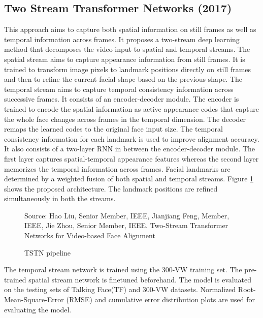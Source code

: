 \documentclass{llncs}
\begin{document}
\subsection{Two Stream Transformer Networks (2017) \textcolor{green}{\cite{tstn}}}

This approach aims to capture both spatial information on still frames as well as temporal information across frames. It proposes a two-stream deep learning method that decomposes the video input to spatial and temporal streams. The spatial stream aims to capture appearance information from still frames. It is trained to transform image pixels to landmark positions directly on still frames and then to refine the current facial shape based on the previous shape. The temporal stream aims to capture temporal consistency information across successive frames. It consists of an encoder-decoder module. The encoder is trained to encode the spatial information as active appearance codes that capture the whole face changes across frames in the temporal dimension. The decoder remaps the learned codes to the original face input size. The temporal consistency information for each landmark is used to improve alignment accuracy. It also consists of a two-layer RNN in between the encoder-decoder module. The first layer captures spatial-temporal appearance features whereas the second layer memorizes the temporal information across frames. Facial landmarks are determined by a weighted fusion of both spatial and temporal streams. Figure \textcolor{red}{\ref{TSTN}} shows the proposed architecture. The landmark positions are refined simultaneously in both the streams.

\begin{figure}
%
{Source: Hao Liu, Senior Member, IEEE, Jianjiang Feng, Member, IEEE, Jie Zhou, Senior Member, IEEE. Two-Stream Transformer Networks for Video-based Face Alignment}
\caption{TSTN pipeline}
\label{TSTN}
\end{figure}

The temporal stream network is trained using the 300-VW training set. The pre-trained spatial stream network is finetuned beforehand. The model is evaluated on the testing sets of Talking Face(TF) and 300-VW datasets. Normalized Root-Mean-Square-Error (RMSE) and cumulative error distribution plots are used for evaluating the model.
\end{document}
